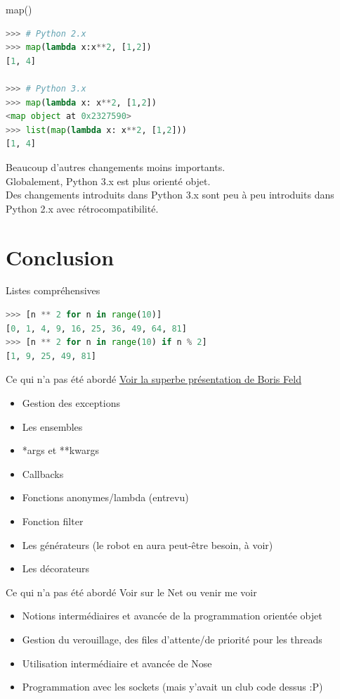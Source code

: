 \documentclass{beamer}
\begin{document}
\begin{frame}[fragile]{map()}
\begin{lstlisting}[language=python]
>>> # Python 2.x
>>> map(lambda x:x**2, [1,2])
[1, 4]

>>> # Python 3.x
>>> map(lambda x: x**2, [1,2])
<map object at 0x2327590>
>>> list(map(lambda x: x**2, [1,2]))
[1, 4]
\end{lstlisting}
Beaucoup d'autres changements moins importants.\\
Globalement, Python 3.x est plus orienté objet.\\
Des changements introduits dans Python 3.x sont peu à peu introduits dans Python 2.x avec rétrocompatibilité.
\end{frame}

\section{Conclusion}

\begin{frame}[fragile]{Listes compréhensives}
\begin{lstlisting}[language=python]
>>> [n ** 2 for n in range(10)]
[0, 1, 4, 9, 16, 25, 36, 49, 64, 81]
>>> [n ** 2 for n in range(10) if n % 2]
[1, 9, 25, 49, 81]
\end{lstlisting}
\end{frame}

\begin{frame}{Ce qui n'a pas été abordé}
\underline{\href{http://feldboris.alwaysdata.net/blog/pages/presentations/pythonutbm}{Voir la superbe présentation de Boris Feld}}
\begin{itemize}
 \item Gestion des exceptions
 \item Les ensembles
 \item *args et **kwargs
 \item Callbacks
 \item Fonctions anonymes/lambda (entrevu)
 \item Fonction filter
 \item Les générateurs (le robot en aura peut-être besoin, à voir)
 \item Les décorateurs
\end{itemize}
\end{frame}

\begin{frame}{Ce qui n'a pas été abordé}
Voir sur le Net ou venir me voir
\begin{itemize}
 \item Notions intermédiaires et avancée de la programmation orientée objet
 \item Gestion du verouillage, des files d'attente/de priorité pour les threads
 \item Utilisation intermédiaire et avancée de Nose
 \item Programmation avec les sockets (mais y'avait un club code dessus :P)
\end{itemize}
\end{frame}
\end{document}
